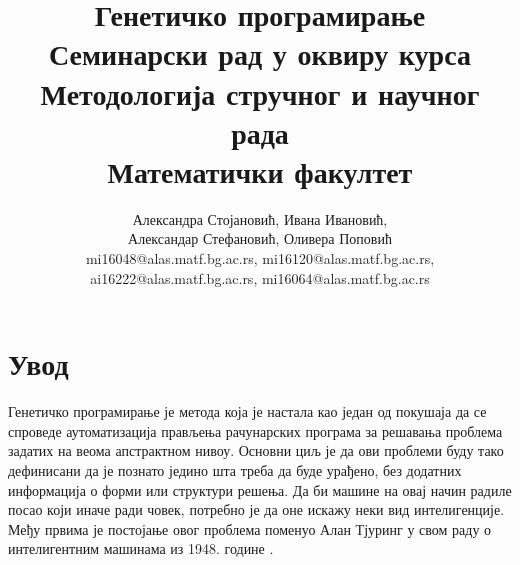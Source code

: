 \documentclass[a4paper]{article}
\begin{document}
\title{Генетичко програмирање\\ \small{Семинарски рад у оквиру курса\\Методологија стручног и научног рада\\ Математички факултет}}

\author{Александра Стојановић, Ивана Ивановић,\\ Александар Стефановић, Оливера Поповић\\ mi16048@alas.matf.bg.ac.rs, mi16120@alas.matf.bg.ac.rs,\\ ai16222@alas.matf.bg.ac.rs, mi16064@alas.matf.bg.ac.rs}


\maketitle


\tableofcontents

\newpage

\section{Увод}

Генетичко програмирање је метода која је настала као један од покушаја да се спроведе аутоматизација прављења рачунарских програма за решавања проблема задатих на веома апстрактном нивоу. Основни циљ је да ови проблеми буду тако дефинисани да је познато једино шта треба да буде урађено, без додатних информација о форми или структури решења. Да би машине на овај начин радиле посао који иначе ради човек, потребно је да оне искажу неки вид интелигенције. Међу првима је постојање овог проблема поменуо Алан Тјуринг у свом раду о интелигентним машинама из 1948. године \cite{turing}.
\end{document}
